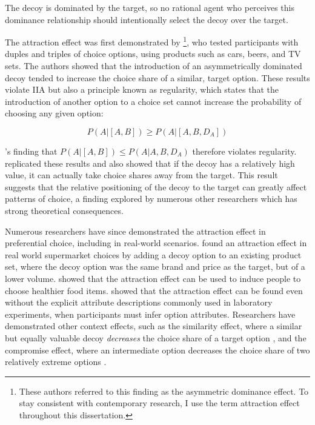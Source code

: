 The decoy is dominated by the target, so no rational agent who perceives this dominance relationship should intentionally select the decoy over the target.

The attraction effect was first demonstrated by \textcite{huberAddingAsymmetricallyDominated1982d} \footnote{These authors referred to this finding as the asymmetric dominance effect. To stay consistent with contemporary research, I use the term attraction effect throughout this dissertation.}, who tested participants with duples and triples of choice options, using products such as cars, beers, and TV sets. The authors showed that the introduction of an asymmetrically dominated decoy tended to increase the choice share of a similar, target option. These results violate IIA but also a principle known as regularity, which states that the introduction of another option to a choice set cannot increase the probability of choosing any given option:

\begin{equation}
  P(A|[A,B])\geq P(A|[A,B,D_{A}])
  \label{eqn:reg_att}
\end{equation}

\textcite{huberAddingAsymmetricallyDominated1982d}'s finding that $P(A|[A,B])\leq P(A|A,B,D_{A})$ therefore violates regularity. \textcite{huber1983market} replicated these results and also showed that if the decoy has a relatively high value, it can actually take choice shares away from the target. This result suggests that the relative positioning of the decoy to the target can greatly affect patterns of choice, a finding explored by numerous other researchers which has strong theoretical consequences.

Numerous researchers have since demonstrated the attraction effect in preferential choice, including in real-world scenarios. \textcite{doyleRobustnessAsymmetricallyDominated1999} found an attraction effect in real world supermarket choices by adding a decoy option to an existing product set, where the decoy option was the same brand and price as the target, but of a lower volume. \textcite{van2021attract} showed that the attraction effect can be used to induce people to choose healthier food items. \textcite{slaughterDecoyEffectsAttributelevel1999b} showed that the attraction effect can be found even without the explicit attribute descriptions commonly used in laboratory experiments, when participants must infer option attributes. Researchers have demonstrated other context effects, such as the similarity effect, where a similar but equally valuable decoy \textit{decreases} the choice share of a target option \parencite{tverskyEliminationAspectsTheory1972}, and the compromise effect, where an intermediate option decreases the choice share of two relatively extreme options \parencite{simonsonChoiceBasedReasons1989b}. 

